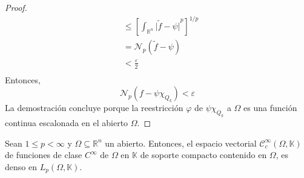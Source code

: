 \documentclass[12pt]{report}
\theoremstyle{largebreak}
\newcommand\abs[1]{\ensuremath{\big|#1\big|}}
\newcommand{\N}[2]{\ensuremath{\mathcal{N}_{#1}\left(#2\right)}}
\begin{document}
\begin{proof}
\begin{equation*}
\begin{split}
                &\leq\left[\int_{\mathbb{R}^n}\abs{\widetilde{f}-\psi}^p \right]^{1/p}\\
                &=\N{p}{\widetilde{f}-\psi}\\
                &<\frac{\varepsilon}{2}\\
            \end{split}
        \end{equation*}
        Entonces,
        \begin{equation*}
            \N{p}{f-\psi\chi_{Q_k}}<\varepsilon
        \end{equation*}
        La demostración concluye porque la reestricción $\varphi$ de $\psi\chi_{Q_k}$ a $\Omega$ es una función continua escalonada en el abierto $\Omega$.
    \end{proof}

    \begin{theor}
        Sean $1\leq p<\infty$ y $\Omega\subseteq\mathbb{R}^n$ un abierto. Entonces, el espacio vectorial $\mathcal{C}_c^\infty(\Omega,\mathbb{K})$ de funciones de clase $C^\infty$ de $\Omega$ en $\mathbb{K}$ de soporte compacto contenido en $\Omega$, es denso en $L_p(\Omega,\mathbb{K})$.
    \end{theor}
\end{document}
